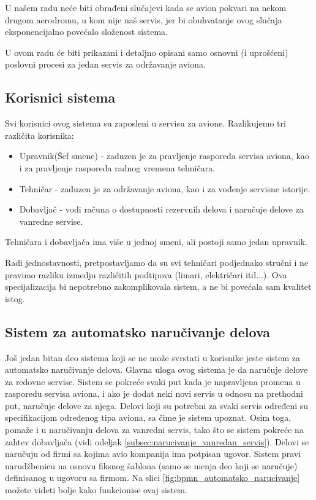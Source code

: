 \documentclass[a4paper]{article}
\begin{document}
U našem radu neće biti obrađeni slučajevi kada se avion pokvari na nekom drugom aerodromu, u kom nije naš servis, jer bi obuhvatanje ovog slučaja  eksponencijalno povećalo složenost sistema.

U ovom radu će biti prikazani i detaljno opisani samo osnovni (i uprošćeni) poslovni procesi za jedan servis za održavanje aviona.
    


\subsection{Korisnici sistema}
\label{subsec:korisnici_sistema}
Svi korisnici ovog sistema su zaposleni u servisu za avione. Razlikujemo tri različita korisnika:
\begin{itemize}
    \item Upravnik(Šef smene) - zaduzen je za pravljenje rasporeda servisa aviona, kao i za pravljenje rasporeda radnog vremena tehničara.
    \item Tehničar - zaduzen je za održavanje aviona, kao i za vođenje servisne istorije.
    \item Dobavljač - vodi računa o dostupnosti rezervnih delova i naručuje delove za vanredne servise.
\end{itemize}
Tehničara i dobavljača ima više u jednoj smeni, ali postoji samo jedan upravnik.

Radi jednostavnosti, pretpostavljamo da su svi tehničari podjednako stručni i ne pravimo razliku izmedju različitih podtipova (limari, električari itd...). Ova specijalizacija bi nepotrebno zakomplikovala sistem, a ne bi povećala sam kvalitet istog.

\subsection{Sistem za automatsko naručivanje delova}
\label{subsec:sistem_za_automatsko_narucivanje_delova}
Još jedan bitan deo sistema koji se ne može svrstati u korisnike jeste sistem za automatsko naručivanje delova. Glavna uloga ovog sistema je da naručuje delove za redovne servise. Sistem se pokreće svaki put kada je napravljena promena u rasporedu servisa aviona, i ako je dodat neki novi servis u odnosu na prethodni put, naručuje delove za njega. Delovi koji su potrebni za svaki servis određeni su specifikacijom određenog tipa aviona, sa čime je sistem upoznat. Osim toga, pomaže i u naručivanju delova za vanredni servis, tako što se sistem pokreće na zahtev dobavljača (vidi odeljak \ref{subsec:narucivanje_vanredan_servis}). Delovi se naručuju od firmi sa kojima avio kompanija ima potpisan ugovor. Sistem pravi narudžbenicu na osnovu fiksnog šablona (samo se menja deo koji se naručuje) definisanog u ugovoru sa firmom. Na slici \ref{fig:bpmn_automatsko_narucivanje} možete videti bolje kako funkcionise ovaj sistem.
\end{document}
